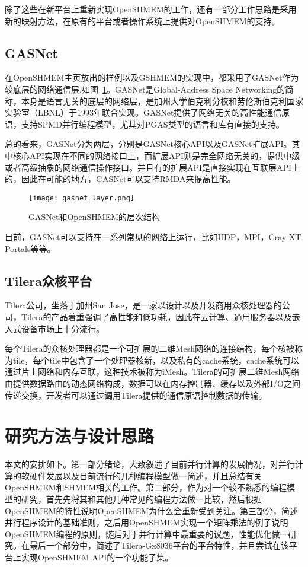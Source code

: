 除了这些在新平台上重新实现OpenSHMEM的工作，还有一部分工作思路是采用新的映射方法，在原有的平台或者操作系统上提供对OpenSHMEM的支持\cite{jour:intra-node}。
\subsection{GASNet}
在OpenSHMEM主页放出的样例以及GSHMEM的实现中，都采用了GASNet作为较底层的网络通信层,如图~\ref{fig:gasnet}。GASNet是Global-Address Space Networking的简称，本身是语言无关的底层的网络层，是加州大学伯克利分校和劳伦斯伯克利国家实验室（LBNL）于1993年联合实现。GASNet提供了网络无关的高性能通信原语，支持SPMD并行编程模型，尤其对PGAS类型的语言和库有直接的支持。

总的看来，GASNet分为两层，分别是GASNet核心API以及GASNet扩展API。其中核心API实现在不同的网络接口上，而扩展API则是完全网络无关的，提供中级或者高级抽象的网络通信操作接口。并且有的扩展API是直接实现在互联层API上的，因此在可能的地方，GASNet可以支持RMDA来提高性能。
\begin{figure}
\centering
\texttt{[image: gasnet\_layer.png]}
\caption{GASNet和OpenSHMEM的层次结构}\label{fig:gasnet}
\end{figure}
目前，GASNet可以支持在一系列常见的网络上运行，比如UDP，MPI，Cray XT Portals等等。

\subsection{Tilera众核平台}
Tilera公司，坐落于加州San Jose，是一家以设计以及开发商用众核处理器的公司，Tilera的产品着重强调了高性能和低功耗，因此在云计算、通用服务器以及嵌入式设备市场上十分流行。

每个Tilera的众核处理器都是一个可扩展的二维Mesh网络的连接结构，每个核被称为tile，每个tile中包含了一个处理器核新，以及私有的cache系统，cache系统可以通过片上网络和内存互联，这种技术被称为iMesh。Tilera的可扩展二维Mesh网络由提供数据路由的动态网络构成，数据可以在内存控制器、缓存以及外部I/O之间传递交换，开发者可以通过调用Tilera提供的通信原语控制数据的传输。

\section{研究方法与设计思路}
本文的安排如下。第一部分绪论，大致叙述了目前并行计算的发展情况，对并行计算的软硬件发展以及目前流行的几种编程模型做一简述，并且总结有关OpenSHMEM和SHMEM相关的工作。第二部分，作为对一个较不熟悉的编程模型的研究，首先先将其和其他几种常见的编程方法做一比较，然后根据OpenSHMEM的特性说明OpenSHMEM为什么会重新受到关注。第三部分，简述并行程序设计的基础准则，之后用OpenSHMEM实现一个矩阵乘法的例子说明OpenSHMEM编程的原则，随后对于并行计算中最重要的议题，性能优化做一研究。在最后一个部分中，简述了Tilera-Gx8036平台的平台特性，并且尝试在该平台上实现OpenSHMEM API的一个功能子集。